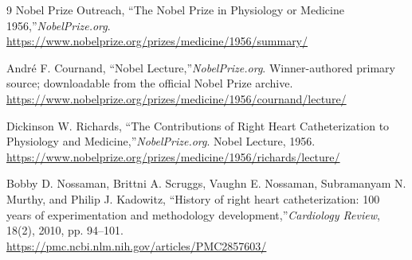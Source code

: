 \begin{thebibliography}{9}
Nobel Prize Outreach, ``The Nobel Prize in Physiology or Medicine 1956,''\emph{NobelPrize.org}.\\
\url{https://www.nobelprize.org/prizes/medicine/1956/summary/}

Andr\'e F. Cournand, ``Nobel Lecture,''\emph{NobelPrize.org}. Winner-authored primary source; downloadable from the official Nobel Prize archive.\\
\url{https://www.nobelprize.org/prizes/medicine/1956/cournand/lecture/}

Dickinson W. Richards, ``The Contributions of Right Heart Catheterization to Physiology and Medicine,''\emph{NobelPrize.org}. Nobel Lecture, 1956.\\
\url{https://www.nobelprize.org/prizes/medicine/1956/richards/lecture/}

Bobby D. Nossaman, Brittni A. Scruggs, Vaughn E. Nossaman, Subramanyam N. Murthy, and Philip J. Kadowitz, ``History of right heart catheterization: 100 years of experimentation and methodology development,''\emph{Cardiology Review}, 18(2), 2010, pp. 94--101.\\
\url{https://pmc.ncbi.nlm.nih.gov/articles/PMC2857603/}
\end{thebibliography}
